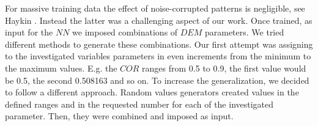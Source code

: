 For massive training data the effect of noise-corrupted patterns is negligible, see Haykin \cite{RefWorks:158}. 
Instead the latter was a challenging aspect of our work. Once trained, as input for the $NN$ we imposed 
combinations of $DEM$ parameters. 
We tried different methods to generate these combinations. 
Our first attempt was assigning to the investigated variables parameters in even increments 
from the minimum to the maximum values. 
E.g. the $COR$ ranges from 0.5 to 0.9, the first value would be 0.5, the second 0.508163 and so on. 
To increase the generalization, we decided to follow a different approach. 
Random values generators created values in the defined ranges and in the requested 
number for each of the investigated parameter. Then, they were combined and imposed as input.\\
